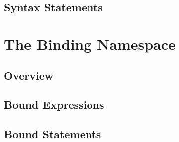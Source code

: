 \documentclass{article}
\begin{document}
\subsection{Syntax Statements}
\label{syntax:statements}



\section{The Binding Namespace}
\label{binding:namespace}

\subsection{Overview}
\label{binding:overview}

\subsection{Bound Expressions}
\label{binding:expressions}

\subsection{Bound Statements}
\label{binding:statements}
\end{document}
